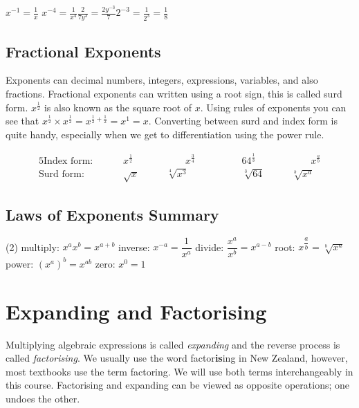 \begin{tcolorbox}
	\hspace{1cm}$\displaystyle x^{-1}=\frac{1}{x}$ \hspace{2cm}$\displaystyle x^{-4}=\frac{1}{x^4}$\hspace{2cm}$\displaystyle\frac{2}{7y^3}=\frac{2y^{-3}}{7} $\hspace{2cm}$\displaystyle 2^{-3}=\frac{1}{2^3}=\frac{1}{8} $
\end{tcolorbox}	

\subsection*{Fractional Exponents}
Exponents can decimal numbers, integers, expressions, variables, and also fractions. Fractional exponents can written using a root sign, this is called surd form. $x^{\frac{1}{2}}$ is also known as the square root of $x$. Using rules of exponents you can see that $x^{\frac{1}{2}}\times x^{\frac{1}{2}}=x^{\frac{1}{2}+\frac{1}{2}}=x^1=x$. Converting between surd and index form is quite handy, especially when we get to differentiation using the power rule.
\begin{tcolorbox}\begin{alignat*}{5}
\textrm{Index form: }\qquad&x^{\frac{1}{2}}&\qquad\qquad x^{\frac{3}{4}} &\qquad\qquad 64^{\frac{1}{3}}&\qquad\qquad x^\frac{a}{b}\\
\textrm{Surd form: }\qquad&\sqrt{x}&\qquad \sqrt[4]{x^3}&\qquad\qquad\sqrt[3]{64}&\qquad \sqrt[b]{x^a}
\end{alignat*}\end{tcolorbox}

\subsection*{Laws of Exponents Summary}
\begin{tcolorbox}
\begin{tasks}[style=itemize](2)
	\task[] multiply: $ x^a x^b = x^{a+b}$
	\task[] inverse: $x^{-a}  =\dfrac{1}{x^a} $
	\task[] divide: $ \dfrac{x^a}{x^b}  =x^{a-b} $
	\task[] root: $ x^{\dfrac{a}{b}}  =\sqrt[b]{x^a}$
	\task[] power: $\displaystyle (x^a)^b  =x^{ab} $
	\task[] zero: $x^0  =1 $
\end{tasks}	
\end{tcolorbox}
	
\section*{Expanding and Factorising}
Multiplying algebraic expressions is called \emph{expanding} and the reverse process is called \emph{factorising}. We usually use the word factor\textbf{is}ing in New Zealand, however, most textbooks use the term factoring. We will use both terms interchangeably in this course. Factorising and expanding can be viewed as opposite operations; one undoes the other.  

